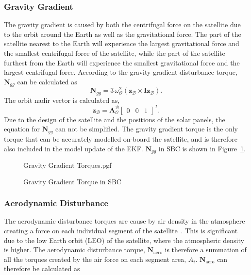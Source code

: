 \subsubsection{Gravity Gradient}
The gravity gradient is caused by both the centrifugal force on the satellite due to the orbit around the Earth as well as the gravitational force. The part of the satellite nearest to the Earth will experience the largest gravitational force and the smallest centrifugal force of the satellite, while the part of the satellite furthest from the Earth will experience the smallest gravitational force and the largest centrifugal force. According to \cite{wertz2012spacecraft} the gravity gradient disturbance torque, $\mathbf{N}_{gg}$ can be calculated as 
\begin{equation}
\boldsymbol{N}_{gg} = 3 \, \omega_\mathcal{O}^2 (\mathbf{z}_{\mathcal{B}} \times \mathbf{Iz}_{\mathcal{B}}).
\end{equation}
The orbit nadir vector is calculated as,
\begin{equation}
\mathbf{z}_{\mathcal{B}} = \boldsymbol{A}^{\mathcal{B}}_{\mathcal{O}} \begin{bmatrix} 0 & 0 & 1 \end{bmatrix}^T.
\end{equation}
Due to the design of the satellite and the positions of the solar panels, the equation for $\mathbf{N}_{gg}$ can not be simplified. The gravity gradient torque is the only torque that can be accurately modelled on-board the satellite, and is therefore also included in the model update of the EKF. $\mathbf{N}_{gg}$ in SBC is shown in Figure~\ref{fig:GravityGradientTorques}.

\begin{figure}[!htb]
	\centering
	\def\pgfwidth{10cm}
	{Gravity Gradient Torques.pgf}
	
	\caption{Gravity Gradient Torque in SBC}
	\label{fig:GravityGradientTorques}
\end{figure}

\subsubsection{Aerodynamic Disturbance}
The aerodynamic disturbance torques are cause by air density in the atmosphere creating a force on each individual segment of the satellite~\cite{Steyn2014}. This is significant due to the low Earth orbit (LEO) of the satellite, where the atmospheric density is higher. The aerodynamic disturbance torque, $\mathbf{N}_{\text{aero}}$ is therefore a summation of all the torques created by the air force on each segment area, $A_i$. $\mathbf{N}_{\text{aero}}$ can therefore be calculated as

